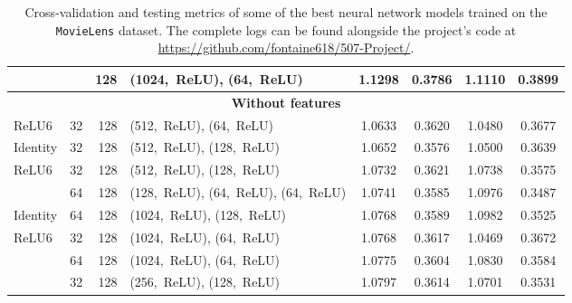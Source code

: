\begin{table}
\begin{tabular}{lrr>{\raggedright\arraybackslash}p{3.6cm}cccc}
           &    & 128 & (1024,~ReLU), (64,~ReLU) &  1.1298 &      0.3786 &   1.1110 &        0.3899 \\
           \midrule
\multicolumn{8}{c}{\textbf{Without features}}\\\addlinespace
ReLU6 & 32  & 128 & (512,~ReLU), (64,~ReLU) &  1.0633 &      0.3620 &   1.0480 &        0.3677 \\
Identity & 32  & 128 & (512,~ReLU), (128,~ReLU) &  1.0652 &      0.3576 &   1.0500 &        0.3639 \\
ReLU6 & 32  & 128 & (512,~ReLU), (128,~ReLU) &  1.0732 &      0.3621 &   1.0738 &        0.3575 \\
                 & 64  & 128 & (128,~ReLU), (64,~ReLU), (64,~ReLU) &  1.0741 &      0.3585 &   1.0976 &        0.3487 \\
Identity & 64  & 128 & (1024,~ReLU), (128,~ReLU) &  1.0768 &      0.3589 &   1.0982 &        0.3525 \\
ReLU6 & 32  & 128 & (1024,~ReLU), (64,~ReLU) &  1.0768 &      0.3617 &   1.0469 &        0.3672 \\
                 & 64  & 128 & (1024,~ReLU), (64,~ReLU) &  1.0775 &      0.3604 &   1.0830 &        0.3584 \\
                 & 32  & 128 & (256,~ReLU), (128,~ReLU) &  1.0797 &      0.3614 &   1.0701 &        0.3531 \\

\bottomrule
\end{tabular}
\caption{Cross-validation and testing metrics of some of the best neural network models trained on the \texttt{MovieLens} dataset. The complete logs can be found alongside the project's code at \url{https://github.com/fontaine618/507-Project/}.}
\label{tab:results.nn}
\end{table}
